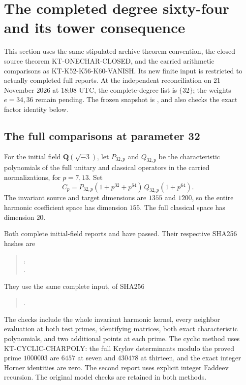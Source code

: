 \section{The completed degree sixty-four and its tower consequence}
\label{sec:kt-next-vanishing}

This section uses the same stipulated archive-theorem convention,
the closed source theorem KT-ONECHAR-CLOSED, and the carried
arithmetic comparisons as KT-K52-K56-K60-VANISH.  Its new finite
input is restricted to actually completed full reports.  At the
independent reconciliation on 21 November 2026 at 18:08 UTC,
the complete-degree list is $\{32\}$; the weights $e=34,36$
remain pending.  The frozen snapshot is
, and
 also checks the exact factor
identity below.

\subsection{The full comparisons at parameter 32}

For the initial field $\mathbf Q(\sqrt{-3})$, let
$P_{32,p}$ and $Q_{32,p}$ be the characteristic polynomials
of the full unitary and classical operators in the carried
normalizations, for $p=7,13$.  Set
\[
 C_p=P_{32,p}(1+p^{32}+p^{64})\,
                         Q_{32,p}(1+p^{64}).                 \tag{KN.1}
\]
The invariant source and target dimensions are $1355$ and
$1200$, so the entire harmonic coefficient space has dimension
$155$.  The full classical space has dimension $20$.

Both complete initial-field reports
 and
 have passed.
Their respective SHA256 hashes are
\begin{quote}\small
{},\\
.
\end{quote}
They use the same complete input, of SHA256
\begin{quote}\small
{}.
\end{quote}
The checks include the whole invariant harmonic kernel, every
neighbor evaluation at both test primes, identifying matrices,
both exact characteristic polynomials, and two additional
points at each prime.  The cyclic method uses
KT-CYCLIC-CHARPOLY: the full Krylov determinants modulo the
proved prime $1000003$ are $6457$ at seven and $430478$ at
thirteen, and the exact integer Horner identities are zero.
The second report uses explicit integer Faddeev recursion.
The original model checks are retained in both methods.

